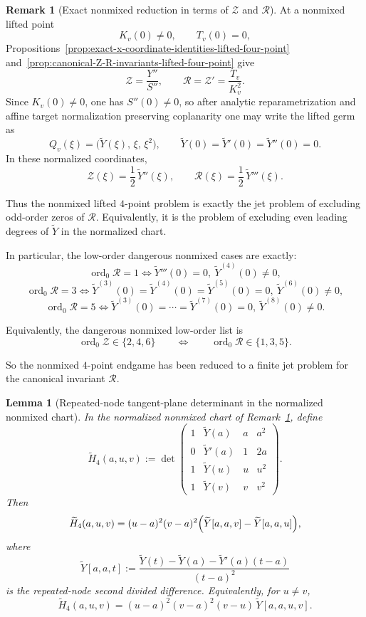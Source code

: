 \documentclass[11pt,a4paper]{amsart}
\theoremstyle{plain}
\newtheorem{lemma}[theorem]{Lemma}
\theoremstyle{definition}
\newtheorem{remark}[theorem]{Remark}
\begin{document}
\begin{remark}[Exact nonmixed reduction in terms of $\mathcal Z$ and $\mathcal R$]
\label{rem:nonmixed-four-point-zeros-can-carry-preexisting-branches}
At a nonmixed lifted point
\[
K_v(0)\neq 0,
\qquad
T_v(0)=0,
\]
Propositions~\ref{prop:exact-x-coordinate-identities-lifted-four-point}
and~\ref{prop:canonical-Z-R-invariants-lifted-four-point} give
\[
\mathcal Z=\frac{Y''}{S''},
\qquad
\mathcal R=\mathcal Z'=\frac{T_v}{K_v^2}.
\]
Since $K_v(0)\neq 0$, one has $S''(0)\neq 0$, so after analytic
reparametrization and affine target normalization preserving coplanarity one may
write the lifted germ as
\[
Q_v(\xi)=\bigl(\widetilde Y(\xi),\,\xi,\,\xi^2\bigr),
\qquad
\widetilde Y(0)=\widetilde Y'(0)=\widetilde Y''(0)=0.
\]
In these normalized coordinates,
\[
\mathcal Z(\xi)=\frac12\,\widetilde Y''(\xi),
\qquad
\mathcal R(\xi)=\frac12\,\widetilde Y'''(\xi).
\]

Thus the nonmixed lifted $4$-point problem is exactly the jet problem of
excluding odd-order zeros of $\mathcal R$. Equivalently, it is the problem of
excluding even leading degrees of $\widetilde Y$ in the normalized chart.

In particular, the low-order dangerous nonmixed cases are exactly:
\[
\operatorname{ord}_0\mathcal R=1
\iff
\widetilde Y'''(0)=0,\ \widetilde Y^{(4)}(0)\neq 0,
\]
\[
\operatorname{ord}_0\mathcal R=3
\iff
\widetilde Y^{(3)}(0)=\widetilde Y^{(4)}(0)=\widetilde Y^{(5)}(0)=0,\
\widetilde Y^{(6)}(0)\neq 0,
\]
\[
\operatorname{ord}_0\mathcal R=5
\iff
\widetilde Y^{(3)}(0)=\cdots=\widetilde Y^{(7)}(0)=0,\
\widetilde Y^{(8)}(0)\neq 0.
\]

Equivalently, the dangerous nonmixed low-order list is
\[
\operatorname{ord}_0\mathcal Z\in\{2,4,6\}
\qquad\Longleftrightarrow\qquad
\operatorname{ord}_0\mathcal R\in\{1,3,5\}.
\]

So the nonmixed $4$-point endgame has been reduced to a finite jet problem
for the canonical invariant $\mathcal R$.
\end{remark}

\begin{lemma}[Repeated-node tangent-plane determinant in the normalized nonmixed chart]
\label{lem:normalized-nonmixed-H4-divided-difference}
In the normalized nonmixed chart of
Remark~\ref{rem:nonmixed-four-point-zeros-can-carry-preexisting-branches},
define
\[
\widetilde H_4(a,u,v):=
\det\!\begin{pmatrix}
1&\widetilde Y(a)&a&a^2\\
0&\widetilde Y'(a)&1&2a\\
1&\widetilde Y(u)&u&u^2\\
1&\widetilde Y(v)&v&v^2
\end{pmatrix}.
\]
Then
\[
\widetilde H_4(a,u,v)
=
(u-a)^2(v-a)^2\Bigl(\widetilde Y[a,a,v]-\widetilde Y[a,a,u]\Bigr),
\]
where
\[
\widetilde Y[a,a,t]
:=
\frac{\widetilde Y(t)-\widetilde Y(a)-\widetilde Y'(a)(t-a)}{(t-a)^2}
\]
is the repeated-node second divided difference.
Equivalently, for $u\neq v$,
\[
\widetilde H_4(a,u,v)
=
(u-a)^2(v-a)^2(v-u)\,\widetilde Y[a,a,u,v].
\]
\end{lemma}
\end{document}
